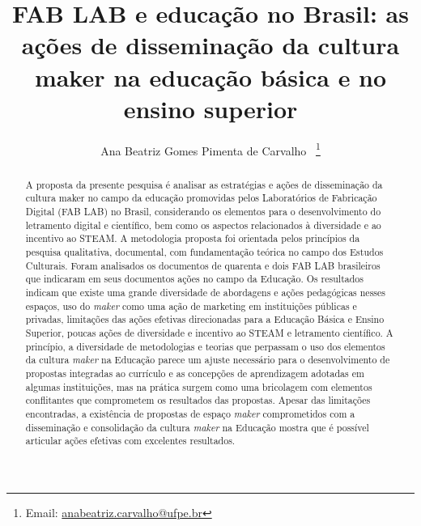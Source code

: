 \documentclass[portuguese]{textolivre}
\title{FAB LAB e educação no Brasil: as ações de disseminação da cultura maker na educação básica e no ensino superior}
\author[1]{Ana Beatriz Gomes Pimenta de Carvalho ~\orcid{0000-0002-2572-7383}\thanks{Email: \href{mailto:anabeatriz.carvalho@ufpe.br}{anabeatriz.carvalho@ufpe.br}}}
\affil[1]{Universidade Federal de Pernambuco, Programa de Pós-Graduação em Educação Matemática e Tecnológica, Recife, PE, Brasil.}
\begin{document}
\maketitle
\begin{polyabstract}
\begin{abstract}
A proposta da presente pesquisa é analisar as estratégias e ações de disseminação da cultura maker no campo da educação promovidas pelos Laboratórios de Fabricação Digital (FAB LAB) no Brasil, considerando os elementos para o desenvolvimento do letramento digital e científico, bem como os aspectos relacionados à diversidade e ao incentivo ao STEAM. A metodologia proposta foi orientada pelos princípios da pesquisa qualitativa, documental, com fundamentação teórica no campo dos Estudos Culturais. Foram analisados os documentos de quarenta e dois FAB LAB brasileiros que indicaram em seus documentos ações no campo da Educação. Os resultados indicam que existe uma grande diversidade de abordagens e ações pedagógicas nesses espaços, uso do \textit{maker} como uma ação de marketing em instituições públicas e privadas, limitações das ações efetivas direcionadas para a Educação Básica e Ensino Superior, poucas ações de diversidade e incentivo ao STEAM e letramento científico. A princípio, a diversidade de metodologias e teorias que perpassam o uso dos elementos da cultura \textit{maker} na Educação parece um ajuste necessário para o desenvolvimento de propostas integradas ao currículo e as concepções de aprendizagem adotadas em algumas instituições, mas na prática surgem como uma bricolagem com elementos conflitantes que comprometem os resultados das propostas. Apesar das limitações encontradas, a existência de propostas de espaço \textit{maker} comprometidos com a disseminação e consolidação da cultura \textit{maker} na Educação mostra que é possível articular ações efetivas com excelentes resultados.

\end{abstract}


\end{polyabstract}
\end{document}
